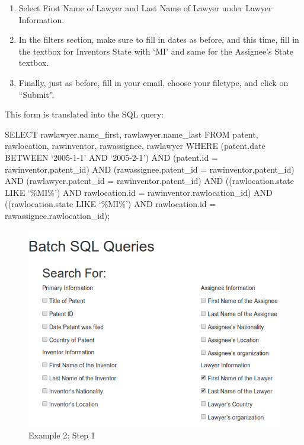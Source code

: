 \begin{enumerate}

\item Select First Name of Lawyer and Last Name of Lawyer under Lawyer Information.

\item In the filters section, make sure to fill in dates as before, and this time, fill in the textbox for Inventors State with ‘MI’ and same for the Assignee’s State textbox.

\item Finally, just as before, fill in your email, choose your filetype, and click on “Submit”.

\end{enumerate}

This form is translated into the SQL query:

SELECT rawlawyer.name\_first, rawlawyer.name\_last FROM patent, rawlocation, rawinventor, rawassignee, rawlawyer WHERE (patent.date BETWEEN ‘2005-1-1’ AND ‘2005-2-1’) AND (patent.id = rawinventor.patent\_id) AND (rawassignee.patent\_id = rawinventor.patent\_id) AND (rawlawyer.patent\_id = rawinventor.patent\_id) AND ((rawlocation.state LIKE ‘\%MI\%’) AND rawlocation.id = rawinventor.rawlocation\_id) AND ((rawlocation.state LIKE ‘\%MI\%’) AND rawlocation.id = rawassignee.rawlocation\_id);

\begin{figure}
\center
\includegraphics[width=.8\textwidth]{figs/ex2s1}
\caption{Example 2: Step 1}
\label{fig:Step 1}
\end{figure}

